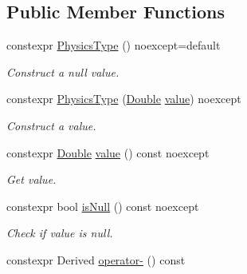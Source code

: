 \subsection*{Public Member Functions}
\begin{DoxyCompactItemize}
\item 
constexpr \hyperlink{class_mdt_1_1_numeric_1_1_physics_type_a696d9d6d263562f2b07651c79901b67e}{Physics\+Type} () noexcept=default\hypertarget{class_mdt_1_1_numeric_1_1_physics_type_a696d9d6d263562f2b07651c79901b67e}{}\label{class_mdt_1_1_numeric_1_1_physics_type_a696d9d6d263562f2b07651c79901b67e}

\begin{DoxyCompactList}\small\item\em Construct a null value. \end{DoxyCompactList}\item 
constexpr \hyperlink{class_mdt_1_1_numeric_1_1_physics_type_a5a5aeff282457f7e34a4ac256640b8e9}{Physics\+Type} (\hyperlink{class_mdt_1_1_numeric_1_1_double}{Double} \hyperlink{class_mdt_1_1_numeric_1_1_physics_type_a9bc72c7175657ebbe35c0d3758fd7454}{value}) noexcept\hypertarget{class_mdt_1_1_numeric_1_1_physics_type_a5a5aeff282457f7e34a4ac256640b8e9}{}\label{class_mdt_1_1_numeric_1_1_physics_type_a5a5aeff282457f7e34a4ac256640b8e9}

\begin{DoxyCompactList}\small\item\em Construct a value. \end{DoxyCompactList}\item 
constexpr \hyperlink{class_mdt_1_1_numeric_1_1_double}{Double} \hyperlink{class_mdt_1_1_numeric_1_1_physics_type_a9bc72c7175657ebbe35c0d3758fd7454}{value} () const noexcept\hypertarget{class_mdt_1_1_numeric_1_1_physics_type_a9bc72c7175657ebbe35c0d3758fd7454}{}\label{class_mdt_1_1_numeric_1_1_physics_type_a9bc72c7175657ebbe35c0d3758fd7454}

\begin{DoxyCompactList}\small\item\em Get value. \end{DoxyCompactList}\item 
constexpr bool \hyperlink{class_mdt_1_1_numeric_1_1_physics_type_a1b845d6c259ae2e71613e7a1115cf779}{is\+Null} () const noexcept\hypertarget{class_mdt_1_1_numeric_1_1_physics_type_a1b845d6c259ae2e71613e7a1115cf779}{}\label{class_mdt_1_1_numeric_1_1_physics_type_a1b845d6c259ae2e71613e7a1115cf779}

\begin{DoxyCompactList}\small\item\em Check if value is null. \end{DoxyCompactList}\item 
constexpr Derived \hyperlink{class_mdt_1_1_numeric_1_1_physics_type_a64db52654db34e613d3cb7f673a6610f}{operator-\/} () const \hypertarget{class_mdt_1_1_numeric_1_1_physics_type_a64db52654db34e613d3cb7f673a6610f}{}\label{class_mdt_1_1_numeric_1_1_physics_type_a64db52654db34e613d3cb7f673a6610f}


\end{DoxyCompactItemize}
